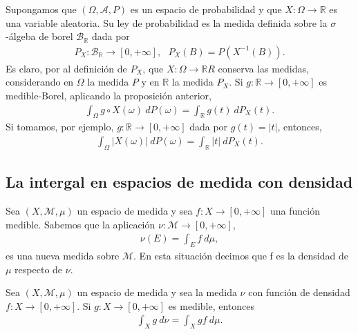 \begin{ejemplo}
    Supongamos que $(\Omega, \mathcal{A}, P)$ es un espacio de probabilidad y que $X: \Omega \longrightarrow \mathbb{R}$ es una variable aleatoria. Su ley de probabilidad es la medida definida sobre la $\sigma$-álgeba de borel $\mathcal{B}_{\mathbb{R}}$ dada por
    \begin{align*}
        P_X: \mathcal{B}_{\mathbb{R}} \longrightarrow [0,+\infty], \ \ \ P_X(B) = P(X^{-1}(B)).
    \end{align*}
    Es claro, por al definición de $P_X$, que $X: \Omega \longrightarrow \mathbb{R}R$ conserva las medidas, considerando en $\Omega$ la medida $P$ y en $\mathbb{R}$ la medida $P_X$. Si $g: \mathbb{R} \longrightarrow [0,+\infty]$ es medible-Borel, aplicando la proposición anterior,
    \begin{align*}
        \int_{\Omega}{g \circ X(\omega) \ dP(\omega)} = \int_{\mathbb{R}}{g(t) \ dP_X(t)}.
    \end{align*}
    Si tomamos, por ejemplo, $g: \mathbb{R} \longrightarrow [0,+\infty]$ dada por $g(t) = |t|$, entonces,
    \begin{align*}
        \int_{\Omega}{|X(\omega)| \ dP(\omega)} = \int_{\mathbb{R}}{|t| \ dP_X(t)}.
    \end{align*}
\end{ejemplo}

\subsection{La intergal en espacios de medida con densidad}

\begin{defi}
    Sea $(X, \mathcal{M},\mu)$ un espacio de medida y sea $f: X \longrightarrow [0,+\infty]$ una función medible. Sabemos que la aplicación $\nu: \mathcal{M} \longrightarrow [0,+\infty]$,
    \begin{align*}
        \nu(E) = \int_{E}{f \ d\mu},
    \end{align*}
    es una nueva medida sobre $\mathcal{M}$. En esta situación decimos que f es la densidad de $\mu$ respecto de $\nu$.
\end{defi}

\begin{teo}
    Sea $(X, \mathcal{M},\mu)$ un espacio de medida y sea la medida $\nu$ con función de densidad $f: X \longrightarrow [0,+\infty]$. Si $g: X \longrightarrow [0,+\infty]$ es medible, entonces
    \begin{align*}
        \int_{X}{g \ d\nu} = \int_{X}{gf \ d\mu}.
    \end{align*}
\end{teo}

